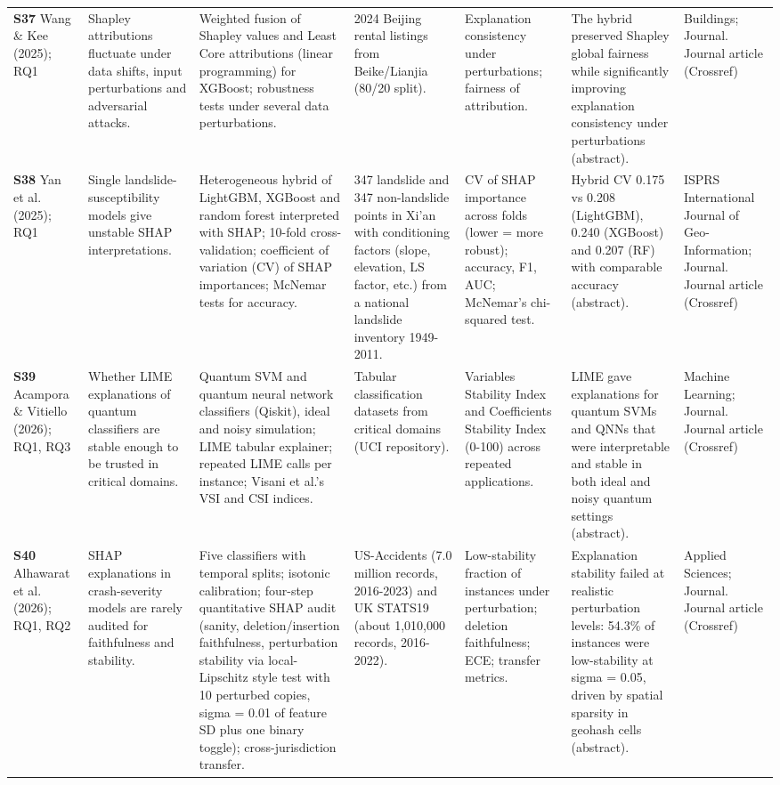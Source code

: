 \begin{longtable}{@{}P{1.55cm}P{2.9cm}P{4.5cm}P{3.2cm}P{3.4cm}P{4.6cm}P{3.6cm}@{}}
\textbf{S37} \cite{S37} Wang \& Kee (2025); RQ1 & Shapley attributions fluctuate under data shifts, input perturbations and adversarial attacks. & Weighted fusion of Shapley values and Least Core attributions (linear programming) for XGBoost; robustness tests under several data perturbations. & 2024 Beijing rental listings from Beike/\allowbreak{}Lianjia (80/\allowbreak{}20 split). & Explanation consistency under perturbations; fairness of attribution. & The hybrid preserved Shapley global fairness while significantly improving explanation consistency under perturbations (abstract). & Buildings; Journal. Journal article (Crossref) \\
\textbf{S38} \cite{S38} Yan et al. (2025); RQ1 & Single landslide-susceptibility models give unstable SHAP interpretations. & Heterogeneous hybrid of LightGBM, XGBoost and random forest interpreted with SHAP; 10-fold cross-validation; coefficient of variation (CV) of SHAP importances; McNemar tests for accuracy. & 347 landslide and 347 non-landslide points in Xi'an with conditioning factors (slope, elevation, LS factor, etc.) from a national landslide inventory 1949-2011. & CV of SHAP importance across folds (lower = more robust); accuracy, F1, AUC; McNemar's chi-squared test. & Hybrid CV 0.175 vs 0.208 (LightGBM), 0.240 (XGBoost) and 0.207 (RF) with comparable accuracy (abstract). & ISPRS International Journal of Geo-Information; Journal. Journal article (Crossref) \\
\textbf{S39} \cite{S39} Acampora \& Vitiello (2026); RQ1, RQ3 & Whether LIME explanations of quantum classifiers are stable enough to be trusted in critical domains. & Quantum SVM and quantum neural network classifiers (Qiskit), ideal and noisy simulation; LIME tabular explainer; repeated LIME calls per instance; Visani et al.'s VSI and CSI indices. & Tabular classification datasets from critical domains (UCI repository). & Variables Stability Index and Coefficients Stability Index (0-100) across repeated applications. & LIME gave explanations for quantum SVMs and QNNs that were interpretable and stable in both ideal and noisy quantum settings (abstract). & Machine Learning; Journal. Journal article (Crossref) \\
\textbf{S40} \cite{S40} Alhawarat et al. (2026); RQ1, RQ2 & SHAP explanations in crash-severity models are rarely audited for faithfulness and stability. & Five classifiers with temporal splits; isotonic calibration; four-step quantitative SHAP audit (sanity, deletion/\allowbreak{}insertion faithfulness, perturbation stability via local-Lipschitz style test with 10 perturbed copies, sigma = 0.01 of feature SD plus one binary toggle); cross-jurisdiction transfer. & US-Accidents (7.0 million records, 2016-2023) and UK STATS19 (about 1,010,000 records, 2016-2022). & Low-stability fraction of instances under perturbation; deletion faithfulness; ECE; transfer metrics. & Explanation stability failed at realistic perturbation levels: 54.3\% of instances were low-stability at sigma = 0.05, driven by spatial sparsity in geohash cells (abstract). & Applied Sciences; Journal. Journal article (Crossref) \\

\end{longtable}
